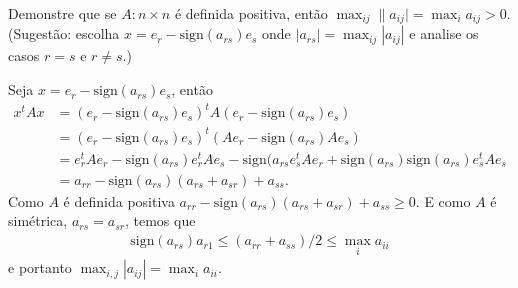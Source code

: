 \begin{questions}
    \question Demonstre que se $A : n \times n$ \'{e} definida positiva, ent\~{a}o $\max_{ij} \| a_{ij} | = \max_i a_{ij} > 0$. (Sugest\~{a}o: escolha $x = e_r - \text{sign}(a_{rs}) e_s$ onde $| a_{rs} | = \max_{ij} | a_{ij} |$ e analise os casos $r = s$ e $r \neq s$.)
    \begin{solution}
        Seja $x = e_r - \text{sign}(a_{rs}) e_s$, ent\~{a}o
        \begin{align*}
            x^t A x &= \left( e_r - \text{sign}(a_{rs}) e_s \right)^t A \left( e_r - \text{sign}(a_{rs}) e_s \right) \\
            &= \left( e_r - \text{sign}(a_{rs}) e_s \right)^t \left( A e_r - \text{sign}(a_{rs}) A e_s \right) \\
            &= e_r^t A e_r - \text{sign}(a_{rs}) e_r^t A e_s - \text{sign}(a_{rs} e_s^t A e_r + \text{sign}(a_{rs}) \text{sign}(a_{rs}) e_s^t A e_s \\
            &= a_{rr} - \text{sign}(a_{rs}) \left( a_{rs} + a_{sr} \right) + a_{ss}.
        \end{align*}
        Como $A$ \'{e} definida positiva $a_{rr} - \text{sign}(a_{rs}) \left( a_{rs} + a_{sr} \right) + a_{ss} \geq 0$. E como $A$ \'{e} sim\'{e}trica, $a_{rs} = a_{sr}$, temos que
        \begin{align*}
            \text{sign}(a_{rs}) a_{r1} \leq \left( a_{rr} + a_{ss} \right) / 2 \leq \max_i a_{ii}
        \end{align*}
        e portanto $\max_{i,j} | a_{ij} | = \max_i a_{ii}$.
    \end{solution}


\end{questions}

